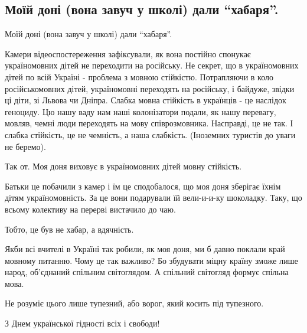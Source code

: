  
 
 
 
 
 
\subsection{Моїй доні (вона завуч у школі) дали \enquote{хабаря}.}
\label{sec:21_11_2020.fb.nitsoi_larysa.1.mova_habar}

Моїй доні (вона завуч у школі) дали \enquote{хабаря}.

Камери відеоспостереження зафіксували, як вона постійно спонукає україномовних
дітей не переходити на російську. Не секрет, що в україномовних дітей по всій
Україні - проблема з мовною стійкістю. Потрапляючи в коло російськомовних
дітей, україномовні переходять на російську, і байдуже, звідки ці діти, зі
Львова чи Дніпра. Слабка мовна стійкість в українців - це наслідок геноциду. Цю
нашу ваду нам наші колонізатори подали, як нашу перевагу, мовляв, чемні люди
переходять на мову співрозмовника. Насправді, це не так. І слабка стійкість, це
не чемність, а наша слабкість. (Іноземних туристів до уваги не беремо).

Так от. Моя доня виховує в україномовних дітей мовну стійкість.

Батьки це побачили з камер і їм це сподобалося, що моя доня зберігає їхнім
дітям україномовність. За це вони подарували їй вели-и-и-ку шоколадку. Таку, що
всьому колективу на перерві вистачило до чаю.  

Тобто, це був не хабар, а вдячність.  

Якби всі вчителі в Україні так робили, як моя доня, ми б давно поклали край
мовному питанню. Чому це так важливо? Бо збудувати міцну країну зможе лише
народ, об'єднаний спільним світоглядом. А спільний світогляд формує спільна
мова.  

Не розуміє цього лише тупезний, або ворог, який косить під тупезного. 

З Днем української гідності всіх і свободи!
